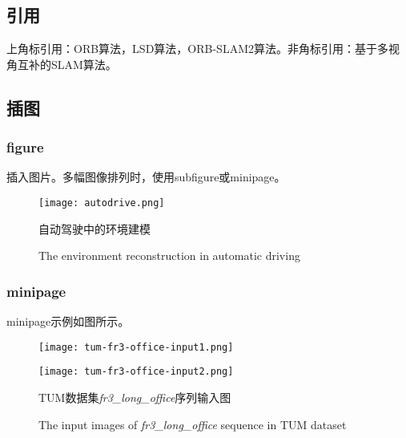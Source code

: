 \subsection{引用}

上角标引用：ORB算法\cite{ORB}，LSD算法，ORB-SLAM2\cite{ORB-SLAM2}算法。非角标引用：基于多视角互补的SLAM算法。

\subsection{插图}

\subsubsection{figure}

插入图片。多幅图像排列时，使用subfigure或minipage。
\begin{figure}[htb]
	\centering
	\texttt{[image: autodrive.png]}
	\caption{自动驾驶中的环境建模\protect\footnotemark[1]}
	\label{fig:introduction:autodrive}
	\addtocounter{figure}{-1}
	\renewcommand{\figurename}{Fig.}
	\caption{The environment reconstruction in automatic driving}
\end{figure}

\subsubsection{minipage}
minipage示例如图所示。

\begin{figure}[htb]
	\centering
	\begin{minipage}[t]{0.45\textwidth}
		\centering
		\texttt{[image: tum-fr3-office-input1.png]}
		\label{fig:line_optim:input1}
	\end{minipage}
	\vspace{0.1in} %
	\begin{minipage}[t]{0.45\textwidth}
		\centering
		\texttt{[image: tum-fr3-office-input2.png]}
		\label{fig:line_optim:input2}
	\end{minipage}
	\vspace{0.1in}
	\caption{TUM数据集{\itshape fr3\_long\_office}序列输入图}
	\label{fig:line_optim:input}
	\addtocounter{figure}{-1} %
	\renewcommand{\figurename}{Fig.}
	\caption{The input images of {\itshape fr3\_long\_office} sequence in TUM dataset}
\end{figure}

